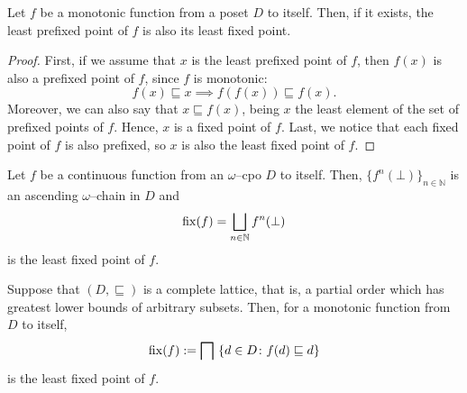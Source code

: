 \begin{lem}\label{lem:cpo-prefixed}
  Let \(f\) be a monotonic function from a poset \(D\) to itself.
  Then, if it exists, the least prefixed point of \(f\) is also its least fixed point.
\end{lem}
\begin{proof}
  First, if we assume that \(x\) is the least prefixed point of \(f\), then \(f(x)\) is also a prefixed point of \(f\), since \(f\) is monotonic:
  \begin{equation*}
    f(x) \sqsubseteq x \implies f(f(x)) \sqsubseteq f(x).
  \end{equation*}
  Moreover, we can also say that \(x \sqsubseteq f(x)\), being \(x\) the least element of the set of prefixed points of \(f\).
  Hence, \(x\) is a fixed point of \(f\).
  Last, we notice that each fixed point of \(f\) is also prefixed, so \(x\) is also the least fixed point of \(f\).\qedhere
\end{proof}

\begin{thm}\label{thm:cpo-fixed}
  Let \(f\) be a continuous function from an \(\omega\)--cpo \(D\) to itself.
  Then, \(\lbrace f^n(\bot) \rbrace_{n \in \mathbb{N}}\) is an ascending \(\omega\)--chain in \(D\) and
  \begin{equation}
    \operatorname{fix}(f) = \bigsqcup_{n \in \mathbb{N}} f^n(\bot)
  \end{equation}
  is the least fixed point of \(f\).
\end{thm}

\begin{thm}\label{thm:knaster-tarski}
  Suppose that \((D, {}\sqsubseteq)\) is a complete lattice, that is, a partial order which has greatest lower bounds of arbitrary subsets.
  Then, for a monotonic function from \(D\) to itself,
  \begin{equation}
    \fix(f) := \bigsqcap\,\,\lbrace d \in D \colon f(d) \sqsubseteq d \rbrace
  \end{equation}
  is the least fixed point of \(f\).
\end{thm}
